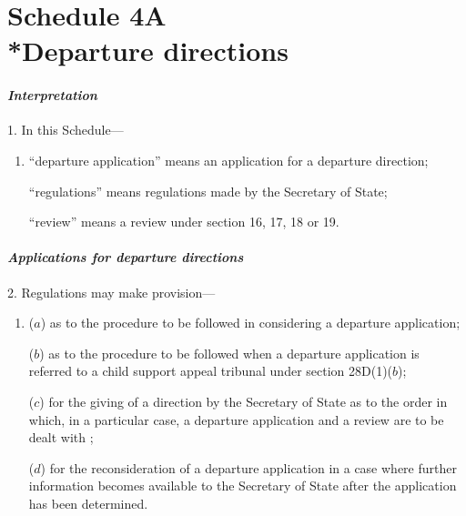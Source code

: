 \documentclass[12pt,a4paper]{article}
\begin{document}

\part[Schedule 4A --- Departure directions]{Schedule 4A\\*Departure directions}

\renewcommand\parthead{--- Schedule 4A}


\subsection*{\itshape Interpretation}

1. In this Schedule—
\begin{enumerate}\item[]
    “departure application” means an application for a departure direction;

    “regulations” means regulations made by the Secretary of State;

    “review” means a review under section 16, 17, 18 or 19. 
\end{enumerate}


\subsection*{\itshape Applications for departure directions}

2. Regulations may make provision—
\begin{enumerate}\item[]
($a$) as to the procedure to be followed in considering a departure application;

($b$) as to the procedure to be followed when a departure application is referred to 
a child support appeal tribunal 
under section 28D(1)($b$);

($c$) for the giving of a direction by the Secretary of State as to the order in which, in a particular case, 
a departure application and a review are to be dealt with%
;

($d$) for the reconsideration of a departure application in a case where further information becomes available to the Secretary of State after the application has been determined.
\end{enumerate}
\end{document}
